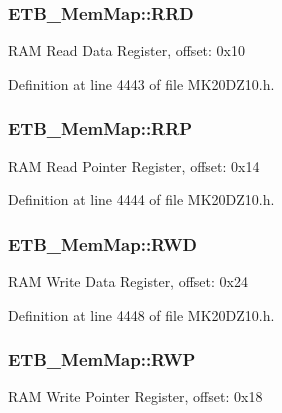 \subsubsection[{\texorpdfstring{R\+RD}{RRD}}]{ E\+T\+B\+\_\+\+Mem\+Map\+::\+R\+RD}\hypertarget{struct_e_t_b___mem_map_a270d960dd4107f020db1f9bf7ef845df}{}\label{struct_e_t_b___mem_map_a270d960dd4107f020db1f9bf7ef845df}
R\+AM Read Data Register, offset\+: 0x10 

Definition at line 4443 of file M\+K20\+D\+Z10.\+h.

\subsubsection[{\texorpdfstring{R\+RP}{RRP}}]{ E\+T\+B\+\_\+\+Mem\+Map\+::\+R\+RP}\hypertarget{struct_e_t_b___mem_map_a891b26a3c18779f393b9f699f42c9916}{}\label{struct_e_t_b___mem_map_a891b26a3c18779f393b9f699f42c9916}
R\+AM Read Pointer Register, offset\+: 0x14 

Definition at line 4444 of file M\+K20\+D\+Z10.\+h.

\subsubsection[{\texorpdfstring{R\+WD}{RWD}}]{ E\+T\+B\+\_\+\+Mem\+Map\+::\+R\+WD}\hypertarget{struct_e_t_b___mem_map_a44fa135beae1216f33813266c1cdd08b}{}\label{struct_e_t_b___mem_map_a44fa135beae1216f33813266c1cdd08b}
R\+AM Write Data Register, offset\+: 0x24 

Definition at line 4448 of file M\+K20\+D\+Z10.\+h.

\subsubsection[{\texorpdfstring{R\+WP}{RWP}}]{ E\+T\+B\+\_\+\+Mem\+Map\+::\+R\+WP}\hypertarget{struct_e_t_b___mem_map_a32780b4c79a1f22e2616d845f306f264}{}\label{struct_e_t_b___mem_map_a32780b4c79a1f22e2616d845f306f264}
R\+AM Write Pointer Register, offset\+: 0x18 

